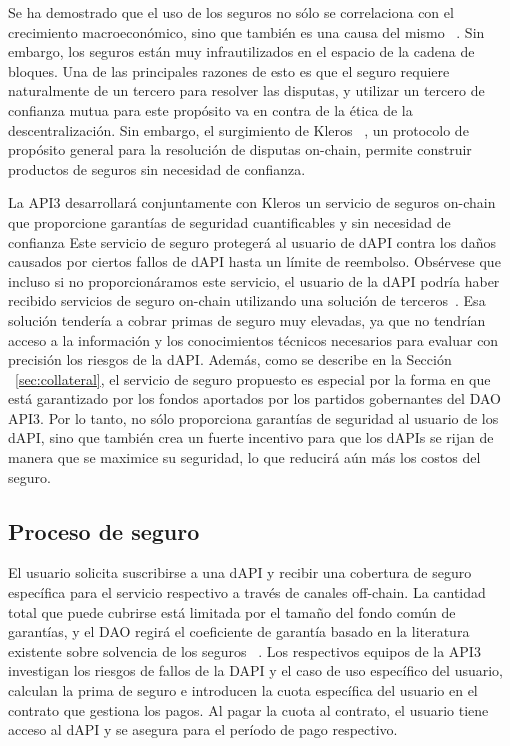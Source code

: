 \documentclass[11pt]{article}
\begin{document}
Se ha demostrado que el uso de los seguros no sólo se correlaciona con el crecimiento macroeconómico, sino que también es una causa del mismo ~\cite{outreville:2013}.
Sin embargo, los seguros están muy infrautilizados en el espacio de la cadena de bloques. Una de las principales razones de esto es que el seguro requiere naturalmente de un tercero para resolver las disputas, y utilizar un tercero de confianza mutua para este propósito va en contra de la ética de la descentralización. Sin embargo, el surgimiento de Kleros ~\cite{kleros:2019}, un protocolo de propósito general para la resolución de disputas on-chain, permite construir productos de seguros sin necesidad de confianza.

La API3 desarrollará conjuntamente con Kleros un servicio de seguros on-chain que proporcione garantías de seguridad cuantificables y sin necesidad de confianza Este servicio de seguro protegerá al usuario de dAPI contra los daños causados por ciertos fallos de dAPI hasta un límite de reembolso. Obsérvese que incluso si no proporcionáramos este servicio, el usuario de la dAPI podría haber recibido servicios de seguro on-chain utilizando una solución de terceros~\cite{nexus-mutual}.
Esa solución tendería a cobrar primas de seguro muy elevadas, ya que no tendrían acceso a la información y los conocimientos técnicos necesarios para evaluar con precisión los riesgos de la dAPI. Además, como se describe en la Sección ~\ref{sec:collateral}, el servicio de seguro propuesto es especial por la forma en que está garantizado por los fondos aportados por los partidos gobernantes del DAO API3. Por lo tanto, no sólo proporciona garantías de seguridad al usuario de los dAPI, sino que también crea un fuerte incentivo para que los dAPIs se rijan de manera que se maximice su seguridad, lo que reducirá aún más los costos del seguro.

\subsection{Proceso de seguro}
\label{sec:insurance-process}

El usuario solicita suscribirse a una dAPI y recibir una cobertura de seguro específica para el servicio respectivo a través de canales off-chain. La cantidad total que puede cubrirse está limitada por el tamaño del fondo común de garantías, y el DAO regirá el coeficiente de garantía basado en la literatura existente sobre solvencia de los seguros ~\cite{solvency}.
Los respectivos equipos de la API3 investigan los riesgos de fallos de la DAPI y el caso de uso específico del usuario, calculan la prima de seguro e introducen la cuota específica del usuario en el contrato que gestiona los pagos.  Al pagar la cuota al contrato, el usuario tiene acceso al dAPI y se asegura para el período de pago respectivo.
\end{document}
